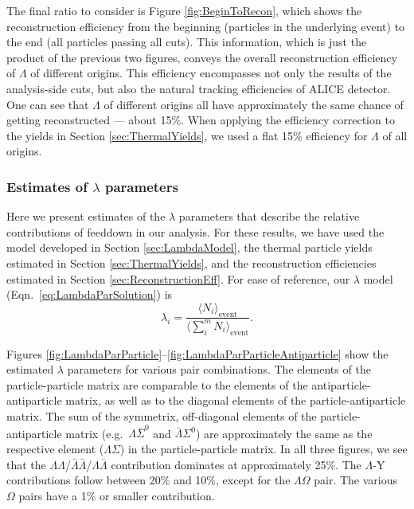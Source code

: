 The final ratio to consider is Figure \ref{fig:BeginToRecon}, which shows the reconstruction efficiency from the beginning (particles in the underlying event) to the end (all particles passing all cuts).
This information, which is just the product of the previous two figures, conveys the overall reconstruction efficiency of $\Lambda$ of different origins.
This efficiency encompasses not only the results of the analysis-side cuts, but also the natural tracking efficiencies of ALICE detector.  
One can see that $\Lambda$ of different origins all have approximately the same chance of getting reconstructed --- about 15\%.
When applying the efficiency correction to the yields in Section \ref{sec:ThermalYields}, we used a flat 15\% efficiency for $\Lambda$ of all origins.

\subsubsection{Estimates of \texorpdfstring{$\lambda$}{lambda} parameters}
\label{sec:LambdaParamEstimates}

Here we present estimates of the $\lambda$ parameters that describe the relative contributions of feeddown in our analysis.
For these results, we have used the model developed in Section \ref{sec:LambdaModel}, the thermal particle yields estimated in Section \ref{sec:ThermalYields}, and the reconstruction efficiencies estimated in Section \ref{sec:ReconstructionEff}.
For ease of reference, our $\lambda$ model (Eqn.\ \ref{eq:LambdaParSolution}) is
$$\lambda_i = \frac{\langle N_{i}\rangle_{\mathrm{event}}} {\langle\sum_i^m N_{i}\rangle_{\mathrm{event}}}.$$

Figures \ref{fig:LambdaParParticle}--\ref{fig:LambdaParParticleAntiparticle} show the estimated $\lambda$ parameters for various pair combinations. 
The elements of the particle-particle matrix are comparable to the elements of the antiparticle-antiparticle matrix, as well as to the diagonal elements of the particle-antiparticle matrix.
The sum of the symmetrix, off-diagonal elements of the particle-antiparticle matrix (e.g.\ $\Lambda\bar{\Sigma}^0$ and $\bar{\Lambda}\Sigma^0$) are approximately the same as the respective element ($\Lambda\Sigma$) in the particle-particle matrix.
In all three figures, we see that the $\Lambda\Lambda$/$\bar{\Lambda}\bar{\Lambda}$/$\Lambda\bar{\Lambda}$ contribution dominates at approximately 25\%. The $\Lambda$-Y contributions follow between 20\% and 10\%, except for the $\Lambda\Omega$ pair. The various $\Omega$ pairs have a 1\% or smaller contribution. 

